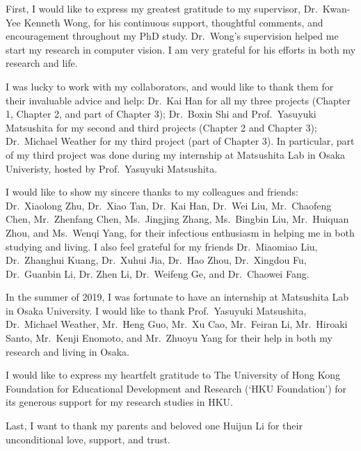 
\begin{acknowledgements}      
First, I would like to express my greatest gratitude to my supervisor, Dr.~Kwan-Yee Kenneth Wong, for his continuous support, thoughtful comments, and encouragement throughout my PhD study. Dr.~Wong's supervision helped me start my research in computer vision. I am very grateful for his efforts in both my research and life.

I was lucky to work with my collaborators, and would like to thank them for their invaluable advice and help:
Dr.~Kai Han for all my three projects (Chapter 1, Chapter 2, and part of Chapter 3);
Dr.~Boxin Shi and Prof.~Yasuyuki Matsushita for my second and third projects (Chapter 2 and Chapter 3);
Dr.~Michael Weather for my third project (part of Chapter 3).
In particular, part of my third project was done during my internship at Matsushita Lab in Osaka Univeristy, hosted by Prof.~Yasuyuki Matsushita.

I would like to show my sincere thanks to my colleagues and friends: Dr.~Xiaolong Zhu, Dr.~Xiao Tan, Dr.~Kai Han, Dr.~Wei Liu, Mr.~Chaofeng Chen, Mr.~Zhenfang Chen, Ms.~Jingjing Zhang, Ms.~Bingbin Liu, Mr.~Huiquan Zhou, and Ms.~Wenqi Yang, for their infectious enthusiasm in helping me in both studying and living.
    I also feel grateful for my friends Dr.~Miaomiao Liu, Dr.~Zhanghui Kuang, Dr.~Xuhui Jia, Dr.~Hao Zhou, Dr.~Xingdou Fu, Dr.~Guanbin Li, Dr. Zhen Li, Dr.~Weifeng Ge, and Dr.~Chaowei Fang.

In the summer of 2019, I was fortunate to have an internship at Matsushita Lab in Osaka University. I would like to thank Prof.~Yasuyuki Matsushita, Dr.~Michael Weather, Mr.~Heng Guo, Mr.~Xu Cao, Mr.~Feiran Li, Mr.~Hiroaki Santo, Mr.~Kenji Enomoto, and Mr.~Zhuoyu Yang for their help in both my research and living in Osaka.

I would like to express my heartfelt gratitude to The University of Hong Kong Foundation for Educational Development and Research (‘HKU Foundation’) for its generous support for my research studies in HKU.

Last, I want to thank my parents and beloved one Huijun Li for their unconditional love, support, and trust.

\end{acknowledgements}
